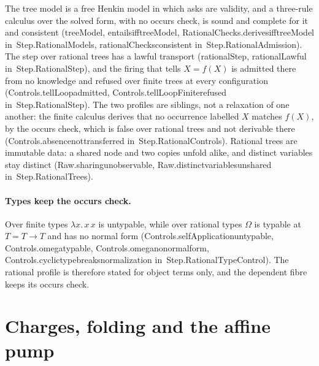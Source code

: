 \documentclass[11pt]{article}
\theoremstyle{remark}
\newcommand{\lean}[1]{{\ttfamily\def\_{\textunderscore\allowbreak}#1}}
\newcommand{\inmod}[1]{in~{\ttfamily\def\_{\textunderscore\allowbreak}#1}}
\begin{document}
The tree model is a free Henkin model in which asks are validity, and a three-rule calculus over the
solved form, with no occurs check, is sound and complete for it and consistent
(\lean{treeModel}, \lean{entails\_iff\_treeModel}, \lean{RationalChecks.derives\_iff\_treeModel} \inmod{Step.RationalModels},
\lean{rationalChecks\_consistent} \inmod{Step.RationalAdmission}). The step over rational trees has a lawful
transport (\lean{rationalStep}, \lean{rationalLawful} \inmod{Step.RationalStep}), and the firing that tells
$X = f(X)$ is admitted there from no knowledge and refused over finite trees at every configuration
(\lean{Controls.tellLoop\_admitted}, \lean{Controls.tellLoopFinite\_refused} \inmod{Step.RationalStep}). The two profiles are siblings, not
a relaxation of one another: the finite calculus derives that no occurrence labelled $X$ matches $f(X)$,
by the occurs check, which is false over rational trees and not derivable there
(\lean{Controls.absence\_not\_transferred} \inmod{Step.RationalControls}). Rational trees are immutable data: a
shared node and two copies unfold alike, and distinct variables stay distinct
(\lean{Raw.sharing\_unobservable}, \lean{Raw.distinct\_variables\_unshared} \inmod{Step.RationalTrees}).

\paragraph{Types keep the occurs check.} Over finite types $\lambda x.\,x\,x$ is untypable, while over
rational types $\Omega$ is typable at $T = T\to T$ and has no normal form
(\lean{Controls.selfApplication\_untypable}, \lean{Controls.omega\_typable}, \lean{Controls.omega\_no\_normal\_form},
\lean{Controls.cyclic\_type\_breaks\_normalization} \inmod{Step.RationalTypeControl}). The rational profile is
therefore stated for object terms only, and the dependent fibre keeps its occurs check.

\section{Charges, folding and the affine pump}
\end{document}
